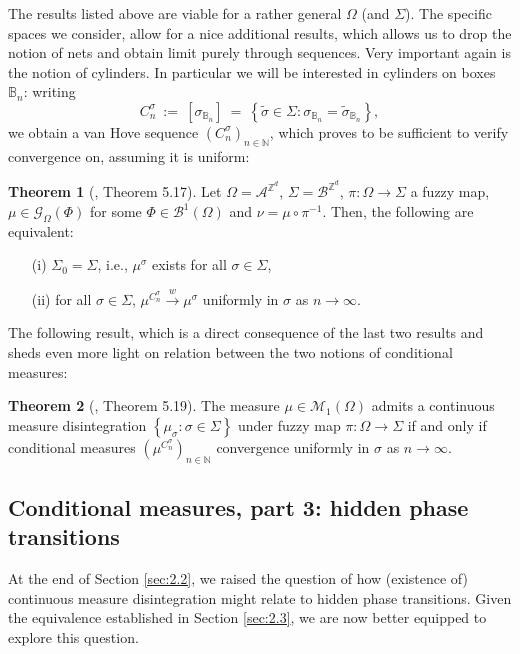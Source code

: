 \documentclass[12pt]{article}
\newcommand{\A}{\mathcal{A}}
\newcommand{\B}{\mathcal{B}}
\newcommand{\BB}{\mathscr{B}}
\newcommand{\BBB}{\mathbb{B}}
\newcommand{\G}{\mathcal{G}}
\newcommand{\M}{\mathcal{M}}
\newcommand{\N}{\mathbb{N}}
\newcommand{\Z}{\mathbb{Z}}
\newcommand{\set}[1]{\left\{#1\right\}}
\newcommand{\ra}{\rightarrow}
\newcommand{\1}{\mathbbm{1}}
\newcommand{\5}{\vspace{0.5cm}}
\renewcommand{\tilde}{\widetilde}
\theoremstyle{definition}
\newtheorem{thm}{Theorem}[section]
\begin{document}
The results listed above are viable for a rather general $\Omega$ (and $\Sigma$). The specific spaces we consider, allow for a nice additional results, which allows us to drop the notion of nets and obtain limit purely through sequences. Very important again is the notion of cylinders. In particular we will be interested in cylinders on boxes $\BBB_n$: writing
$$C_n^\sigma ~:=~ [\sigma_{\BBB_n}] ~=~ \set{\tilde{\sigma}\in\Sigma:\sigma_{\BBB_n}=\tilde{\sigma}_{\BBB_n}},$$
we obtain a van Hove sequence $(C_n^\sigma)_{n\in\N}$, which proves to be sufficient to verify convergence on, assuming it is uniform:
\begin{thm}[\cite{Ber}, Theorem 5.17]
Let $\Omega=\A^{\Z^d}$, $\Sigma=\B^{\Z^d}$, $\pi:\Omega\ra\Sigma$ a fuzzy map, $\mu\in\G_\Omega(\Phi)$ for some $\Phi\in\BB^1(\Omega)$ and $\nu=\mu\circ\pi^{-1}$. Then, the following are equivalent:
\begin{itemize}
	\item[(i)] $\Sigma_0=\Sigma$, i.e., $\mu^\sigma$ exists for all $\sigma\in\Sigma$,
	\item[(ii)] for all $\sigma\in\Sigma$, $\mu^{C_n^\sigma}\xrightarrow{w}\mu^\sigma$ uniformly in $\sigma$ as $n\ra\infty$.
\end{itemize}
\end{thm}

The following result, which is a direct consequence of the last two results and sheds even more light on relation between the two notions of conditional measures:
\begin{thm}[\cite{Ber}, Theorem 5.19]
The measure $\mu\in\M_1(\Omega)$ admits a continuous measure disintegration $\set{\mu_\sigma:\sigma\in\Sigma}$ under fuzzy map $\pi:\Omega\ra\Sigma$ if and only if conditional measures $(\mu^{C_n^\sigma})_{n\in\N}$ convergence uniformly in $\sigma$ as $n\ra\infty$.
\end{thm}


\subsection{Conditional measures, part 3: hidden phase transitions}

At the end of Section \ref{sec:2.2}, we raised the question of how (existence of) continuous measure disintegration might relate to hidden phase transitions. Given the equivalence established in Section \ref{sec:2.3}, we are now better equipped to explore this question. \\
\end{document}
